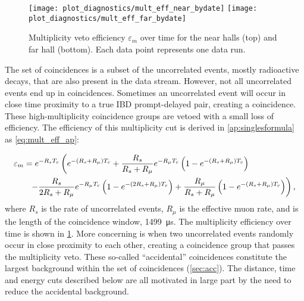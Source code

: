 \begin{figure}
    \centering
    \texttt{[image: plot\_diagnostics/mult\_eff\_near\_bydate]}
    \texttt{[image: plot\_diagnostics/mult\_eff\_far\_bydate]}
    \caption[Multiplicity veto efficiency over time]{
        Multiplicity veto efficiency $\varepsilon_m$ over time for
        the near halls (top) and far hall (bottom).
        Each data point represents one data run.
    }
    \label{fig:mult_eff}
\end{figure}
The set of  coincidences is a subset
of the uncorrelated events, mostly radioactive decays,
that are also present in the data stream.
However, not all uncorrelated events end up in  coincidences.
Sometimes an uncorrelated event will occur in close time proximity to
a true IBD prompt-delayed pair, creating a  coincidence.
These high-multiplicity coincidence groups are vetoed
with a small loss of efficiency.
The efficiency of this multiplicity cut is derived in \cref{ap:singlesformula} as
\cref{eq:mult_eff_ap}:

\begin{align}
    \label{eq:mult_eff}
    \begin{split}
        \varepsilon_m &= e^{-R_s T_c}
        \left(
            e^{-(R_s + R_\mu)T_c} +
            \frac{R_s}{R_s+R_\mu} e^{-R_\mu T_c}
            \left(
                1 - e^{-(R_s + R_\mu)T_c}
            \right)
        \right. \\
              &\ \ \left. - \frac{R_s}{2R_s + R_\mu} e^{-R_\mu T_c}
                  \left(
                      1 - e^{-(2R_s + R_\mu)T_c}
                  \right) +
                  \frac{R_\mu}{R_s + R_\mu}
                  \left(
                      1 - e^{-(R_s + R_\mu)T_c}
                  \right)
              \right),
    \end{split}
\end{align}
where $R_s$ is the rate of uncorrelated events,
$R_\mu$ is the effective muon rate,
and \tc{} is the length of the coincidence window, \SI{1499}{\us}.
The multiplicity efficiency over time is shown in \cref{fig:mult_eff}.
More concerning is when two uncorrelated events
randomly occur in close proximity to each other,
creating a  coincidence group that passes the multiplicity veto.
These so-called ``accidental'' coincidences
constitute the largest background within the set of  coincidences
(\cref{sec:acc}).
The distance, time and energy cuts described below
are all motivated in large part by the need to reduce the accidental background.

